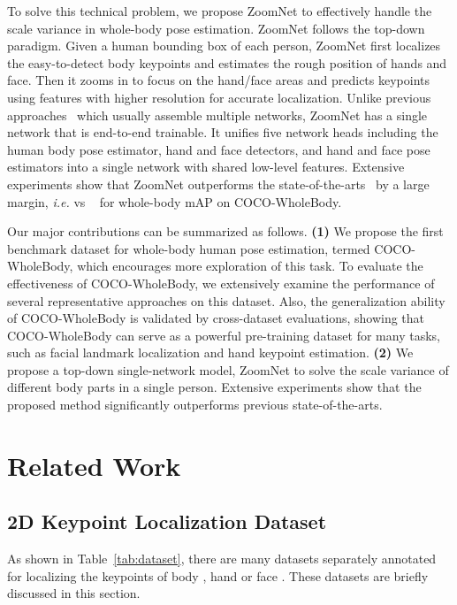 \documentclass[runningheads]{llncs}
\begin{document}
	To solve this technical problem, we propose ZoomNet to effectively handle the scale variance in whole-body pose estimation. ZoomNet follows the top-down paradigm. Given a human bounding box of each person, ZoomNet first localizes the easy-to-detect body keypoints and estimates the rough position of hands and face. Then it zooms in to focus on the hand/face areas and predicts keypoints using features with higher resolution for accurate localization. Unlike previous approaches~\cite{cao2018openpose} which usually assemble multiple networks, ZoomNet has a single network that is end-to-end trainable. It unifies five network heads including the human body pose estimator, hand and face detectors, and hand and face pose estimators into a single network with shared low-level features. Extensive experiments show that ZoomNet outperforms the state-of-the-arts~\cite{cao2018openpose,hidalgo2019single} by a large margin, \emph{i.e.}  vs ~\cite{cao2018openpose} for whole-body mAP on COCO-WholeBody.
	
	Our major contributions can be summarized as follows. \textbf{(1)} We propose the first benchmark dataset for whole-body human pose estimation, termed COCO-WholeBody, which encourages more exploration of this task. To evaluate the effectiveness of COCO-WholeBody, we extensively examine the performance of several representative approaches on this dataset. Also, the generalization ability of COCO-WholeBody is validated by cross-dataset evaluations, showing that COCO-WholeBody can serve as a powerful pre-training dataset for many tasks, such as facial landmark localization and hand keypoint estimation. 
\textbf{(2)} We propose a top-down single-network model, ZoomNet to solve the scale variance of different body parts in a single person. Extensive experiments show that the proposed method significantly outperforms previous state-of-the-arts.
	
	\section{Related Work}
	\label{sec:related_work}
	
	\subsection{2D Keypoint Localization Dataset}
	As shown in Table~\ref{tab:dataset}, there are many datasets separately annotated for localizing the keypoints of body  \cite{andriluka2018posetrack,andriluka14cvpr,eichner2010we,lin2014microsoft,wu2017ai}, hand \cite{gomez2017large,mueller2018ganerated,simon2017hand,tompson2014real,yuan2017bighand2} or face \cite{belhumeur2013localizing,koestinger2011annotated,le2012interactive,messer1999xm2vtsdb,sagonas2013300,zhu2012face}. These datasets are briefly discussed in this section.
	
\end{document}
